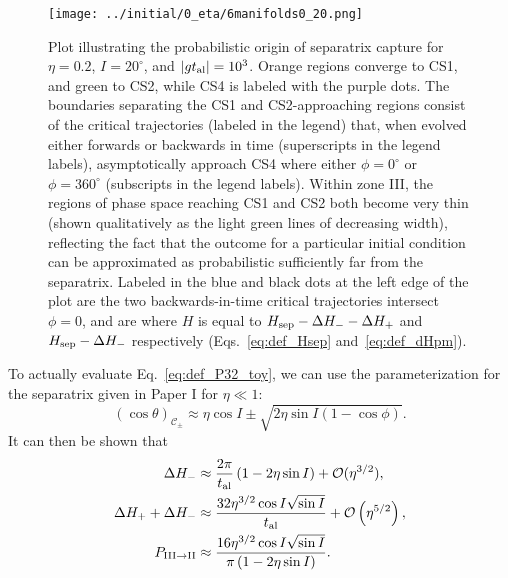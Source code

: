 \documentclass[
        fleqn,
        usenatbib,
    ]{mnras}
\newcommand*{\abs}[1]{\left|#1\right|}
\newcommand*{\p}[1]{\left(#1\right)}
\begin{document}
\begin{figure}
    \centering
    \texttt{[image: ../initial/0\_eta/6manifolds0\_20.png]}
    \caption{Plot illustrating the probabilistic origin of separatrix capture
    for $\eta = 0.2$, $I = 20^\circ$, and $\abs{gt_{\rm al}} = 10^{3}$. Orange
    regions converge to CS1, and green to CS2, while CS4 is labeled with the
    purple dots. The boundaries separating the CS1 and CS2-approaching regions
    consist of the critical trajectories (labeled in the legend) that, when
    evolved either forwards or backwards in time (superscripts in the legend
    labels), asymptotically approach CS4 where either $\phi = 0^\circ$ or $\phi
    = 360^\circ$ (subscripts in the legend labels). Within zone III, the regions
    of phase space reaching CS1 and CS2 both become very thin (shown
    qualitatively as the light green lines of decreasing width), reflecting the
    fact that the outcome for a particular initial condition can be approximated
    as probabilistic sufficiently far from the separatrix. Labeled in the blue
    and black dots at the left edge of the plot are the two backwards-in-time
    critical trajectories intersect $\phi = 0$, and are where $H$ is equal to
    $H_{\rm sep} - \Delta H_- - \Delta H_+$ and $H_{\rm sep} - \Delta H_-$
    respectively (Eqs.~\ref{eq:def_Hsep} and~\ref{eq:def_dHpm}).
    }\label{fig:toy_hop_manifolds}
\end{figure}

To actually evaluate Eq.~\eqref{eq:def_P32_toy}, we can use the parameterization
for the separatrix given in Paper I for $\eta \ll 1$:
\begin{equation}
    \p{\cos \theta}_{\mathcal{C}_{\pm}} \approx
        \eta \cos I \pm \sqrt{2\eta\sin I\p{1 - \cos \phi}}.
        \label{eq:sep_theta}
\end{equation}
It can then be shown that
\begin{align}
    \Delta H_- &\approx \frac{2\pi}{t_{\rm al}}\p{1
        - 2\eta \sin I} + \mathcal{O}(\eta^{3/2}),\\
    \Delta H_+ + \Delta H_- &\approx
        \frac{32 \eta^{3/2}\cos I \sqrt{\sin I}}{t_{\rm al}}
            + \mathcal{O}\p{\eta^{5/2}},\\
    P_{\rm III \to II} &\approx
        \frac{16 \eta^{3/2} \cos I \sqrt{\sin I}}{\pi
            \p{1  - 2\eta \sin I}}.\label{eq:P32_toy}
\end{align}
\end{document}
